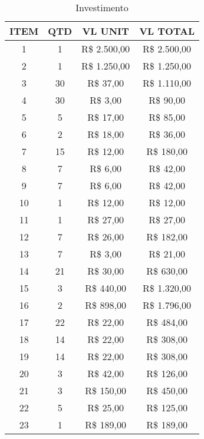 \begin{table}[h!]
\centering
\caption{Investimento}
\label{my-label}
\begin{tabular}{|c|c|c|c|}
\hline
ITEM         & QTD   & VL UNIT      & VL TOTAL      \\ \hline
1            & 1     & R\$ 2.500,00 & R\$ 2.500,00  \\ \hline
2            & 1     & R\$ 1.250,00 & R\$ 1.250,00  \\ \hline
3            & 30    & R\$ 37,00    & R\$ 1.110,00  \\ \hline
4            & 30    & R\$ 3,00     & R\$ 90,00     \\ \hline
5            & 5     & R\$ 17,00    & R\$ 85,00     \\ \hline
6            & 2     & R\$ 18,00    & R\$ 36,00     \\ \hline
7            & 15    & R\$ 12,00    & R\$ 180,00    \\ \hline
8            & 7     & R\$ 6,00     & R\$ 42,00     \\ \hline
9            & 7     & R\$ 6,00     & R\$ 42,00     \\ \hline
10           & 1     & R\$ 12,00    & R\$ 12,00     \\ \hline
11           & 1     & R\$ 27,00    & R\$ 27,00     \\ \hline
12           & 7     & R\$ 26,00    & R\$ 182,00    \\ \hline
13           & 7     & R\$ 3,00     & R\$ 21,00     \\ \hline
14           & 21    & R\$ 30,00    & R\$ 630,00    \\ \hline
15           & 3     & R\$ 440,00   & R\$ 1.320,00  \\ \hline
16           & 2     & R\$ 898,00   & R\$ 1.796,00  \\ \hline
17           & 22    & R\$ 22,00    & R\$ 484,00    \\ \hline
18           & 14    & R\$ 22,00    & R\$ 308,00    \\ \hline
19           & 14    & R\$ 22,00    & R\$ 308,00    \\ \hline
20           & 3     & R\$ 42,00    & R\$ 126,00    \\ \hline
21           & 3     & R\$ 150,00   & R\$ 450,00    \\ \hline
22           & 5     & R\$ 25,00    & R\$ 125,00    \\ \hline
23           & 1     & R\$ 189,00   & R\$ 189,00    \\ \hline

\end{tabular}
\end{table}
